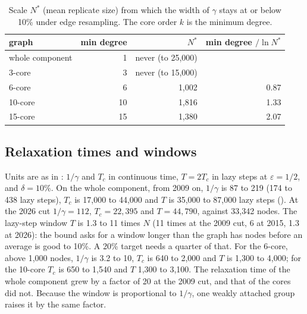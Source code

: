 \documentclass[11pt]{article}
\begin{document}
\begin{table}[t]
\centering
\caption{Scale $N^{*}$ (mean replicate size) from which the width of $\gamma$ stays at or below 10\%
under edge resampling. The core order $k$ is the minimum degree.}\label{tab:crossings}
\begin{tabular}{lrrr}
\toprule
graph & min degree & $N^{*}$ & min degree $/\ln N^{*}$ \\
\midrule
whole component & 1 & never (to 25,000) & \\
3-core & 3 & never (to 15,000) & \\
6-core & 6 & 1,002 & 0.87 \\
10-core & 10 & 1,816 & 1.33 \\
15-core & 15 & 1,380 & 2.07 \\
\bottomrule
\end{tabular}
\end{table}

\subsection{Relaxation times and windows}
Units are as in : $1/\gamma$ and $T_c$ in continuous time, $T = 2T_c$ in lazy steps at
$\varepsilon = 1/2$, and $\delta = 10\%$. On the whole component, from 2009 on, $1/\gamma$ is 87 to 219
(174 to 438 lazy steps), $T_c$ is 17,000 to 44,000 and $T$ is 35,000 to 87,000 lazy steps
(). At the 2026 cut $1/\gamma = 112$, $T_c = 22{,}395$ and $T = 44{,}790$, against 33,342
nodes. The lazy-step window $T$ is 1.3 to 11 times $N$ (11 times at the 2009 cut, 6 at 2015, 1.3 at 2026):
the bound asks for a window longer than the graph has nodes before an average is good to 10\%. A 20\% target needs a
quarter of that. For the 6-core, above 1,000 nodes, $1/\gamma$ is 3.2 to 10, $T_c$ is 640 to 2,000 and $T$
is 1,300 to 4,000; for the 10-core $T_c$ is 650 to 1,540 and $T$ 1,300 to 3,100. The relaxation time of
the whole component grew by a factor of 20 at the 2009 cut, and that of the cores did not. Because the
window is proportional to $1/\gamma$, one weakly attached group raises it by the same factor.
\end{document}
